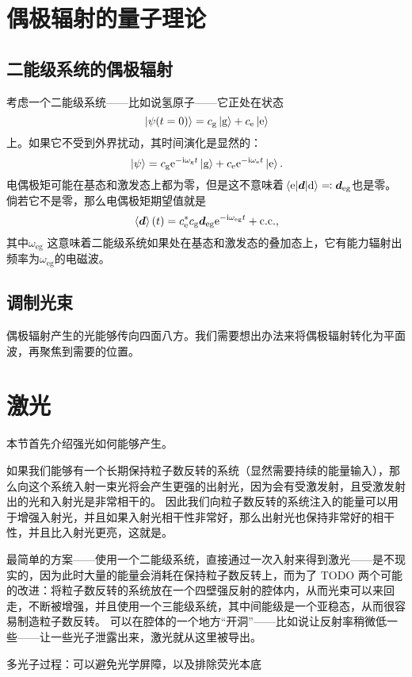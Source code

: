 \chapter{偶极辐射的量子理论}

\section{二能级系统的偶极辐射}

考虑一个二能级系统——比如说氢原子——它正处在状态
\begin{equation}
    \ket*{\psi(t=0)} = c_\text{g} \ket*{\text{g}} + c_\text{e} \ket*{\text{e}}
\end{equation}
上。如果它不受到外界扰动，其时间演化是显然的：
\begin{equation}
    \ket*{\psi} = c_\text{g} \mathrm{e}^{- \mathrm{i} \omega_\text{g} t} \ket*{\text{g}} + c_\text{e} \mathrm{e}^{- \mathrm{i} \omega_\text{e} t} \ket*{\text{e}}.
\end{equation}
电偶极矩可能在基态和激发态上都为零，但是这不意味着$\mel{\text{e}}{\vb*{d}}{\text{d}} \eqqcolon \vb*{d}_\text{eg}$也是零。
倘若它不是零，那么电偶极矩期望值就是
\begin{equation}
    \expval*{\vb*{d}}(t) = c^*_\text{e} c_\text{g} \vb*{d}_{\text{eg}} \mathrm{e}^{- \mathrm{i} \omega_\text{eg} t} + \text{c.c.},
\end{equation}
其中$\omega_\text{eg}$
这意味着二能级系统如果处在基态和激发态的叠加态上，它有能力辐射出频率为$\omega_\text{eg}$的电磁波。

\section{调制光束}

偶极辐射产生的光能够传向四面八方。我们需要想出办法来将偶极辐射转化为平面波，再聚焦到需要的位置。

\chapter{激光}

本节首先介绍强光如何能够产生。

如果我们能够有一个长期保持粒子数反转的系统（显然需要持续的能量输入），那么向这个系统入射一束光将会产生更强的出射光，因为会有受激发射，且受激发射出的光和入射光是非常相干的。
因此我们向粒子数反转的系统注入的能量可以用于增强入射光，并且如果入射光相干性非常好，那么出射光也保持非常好的相干性，并且比入射光更亮，这就是。

最简单的方案——使用一个二能级系统，直接通过一次入射来得到激光——是不现实的，因为此时大量的能量会消耗在保持粒子数反转上，而为了 TODO
两个可能的改进：将粒子数反转的系统放在一个四壁强反射的腔体内，从而光束可以来回走，不断被增强，并且使用一个三能级系统，其中间能级是一个亚稳态，从而很容易制造粒子数反转。
可以在腔体的一个地方“开洞”——比如说让反射率稍微低一些——让一些光子泄露出来，激光就从这里被导出。

多光子过程：可以避免光学屏障，以及排除荧光本底